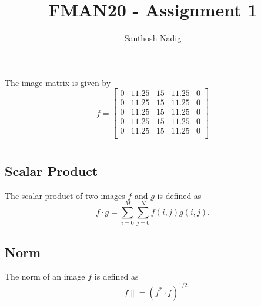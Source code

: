 \documentclass[11pt]{article} %
\title{FMAN20 - Assignment 1}
\author{Santhosh Nadig}
\begin{document}
\maketitle

\section{}
The image matrix is given by
\begin{equation}
f = 
\begin{bmatrix}
         0  &  11.25 & 15 &  11.25   &      0 \\
         0  & 11.25 &  15 &  11.25   &      0 \\
         0  & 11.25 &  15 & 11.25    &     0 \\
         0  & 11.25 &  15 &  11.25   &      0 \\
         0  & 11.25 &  15 &  11.25    &     0 \\
\end{bmatrix}
\end{equation}
\section{}

\section{}

\section{}
\subsection{Scalar Product}
The scalar product of two images  $f$ and  $g$ is defined as
\begin{equation}
f \cdot g = \sum_{i=0}^M \sum_{j=0}^N f(i,j) g(i,j) .
\end{equation}
\subsection{Norm}
The norm of an image  $f$ is defined as
\begin{equation}
\| f \| = (f^* \cdot f)^{1/2} .
\end{equation}
\section{}
\end{document}
